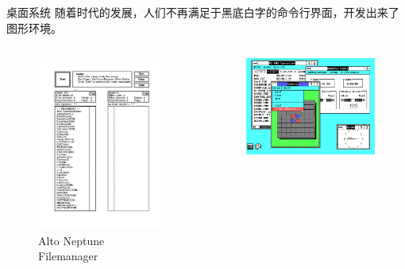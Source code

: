 \documentclass[UTF8]{ctexbeamer}
\begin{document}
\begin{frame}{桌面系统}
    随着时代的发展，人们不再满足于黑底白字的命令行界面，开发出来了图形环境。
    
    \begin{columns}
        \begin{figure}
            \centering
            \includegraphics[width=\textwidth]{altoNeptune.png}
            \caption{Alto Neptune Filemanager}
            \label{fig:altoNeptune}
        \end{figure}
        \begin{figure}
            \centering
            \includegraphics[width=\textwidth]{msdos.png}

\end{figure}
\end{columns}
\end{frame}
\end{document}
